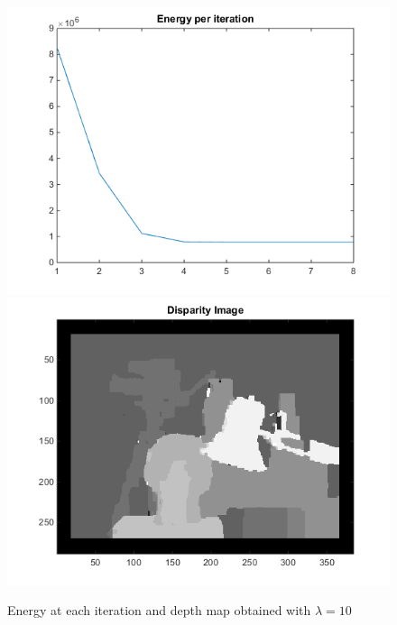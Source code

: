 \documentclass[11pt,a4paper]{article}
\begin{document}
\begin{figure}[H]
	\centering
	\noindent\includegraphics[scale=0.4]{results/energy10.png}
	\noindent\includegraphics[scale=0.4]{results/disparity_est10-7it.png}
	\caption{Energy at each iteration and depth map obtained with $\lambda = 10$}
\end{figure}
\end{document}
